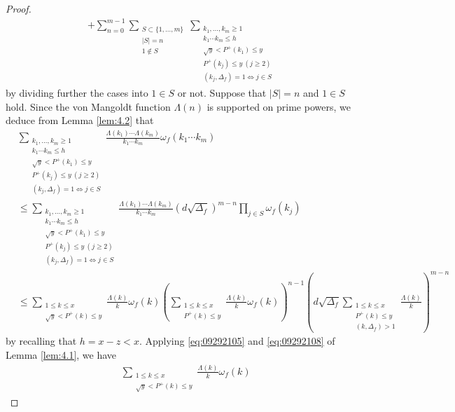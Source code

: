 \documentclass[a4paper,11pt]{amsart}
\theoremstyle{definition}
\numberwithin{equation}{section}
\begin{document}
\begin{proof}
\begin{align}
+ \sum_{n=0}^{m-1} \sum_{\substack{S \subset \{1, \ldots, m\} \\ |S|=n \\ 1 \notin S}}
\sum_{\substack{k_1,\ldots,k_m \geq 1 \\ k_1 \cdots k_m \leq h \\ \sqrt{y} < P^+(k_1) \leq y  \\ P^+(k_j) \leq y ~(j \geq 2) \\ (k_j,\Delta_f)=1 \Leftrightarrow j \in S}} \nonumber
\end{align}
by dividing further the cases into $1 \in S$ or not.
Suppose that $|S|=n$ and $1 \in S$ hold. 
Since the von Mangoldt function $\Lambda(n)$ is supported on prime powers, we deduce from Lemma \ref{lem:4.2} that
\begin{align*}
&\sum_{\substack{k_1,\ldots,k_m \geq 1 \\ k_1 \cdots k_m \leq h \\ \sqrt{y} < P^+(k_1) \leq y  \\ P^+(k_j) \leq y ~(j \geq 2) \\ (k_j,\Delta_f)=1 \Leftrightarrow j \in S}} 
\frac{\Lambda(k_1) \cdots \Lambda(k_m)}{k_1 \cdots k_m} \omega_f(k_1 \cdots k_m) \\
&\leq \sum_{\substack{k_1,\ldots,k_m \geq 1 \\ k_1 \cdots k_m \leq h \\ \sqrt{y} < P^+(k_1) \leq y  \\ P^+(k_j) \leq y ~(j \geq 2) \\ (k_j,\Delta_f)=1 \Leftrightarrow j \in S}} 
\frac{\Lambda(k_1) \cdots \Lambda(k_m)}{k_1 \cdots k_m} (d \sqrt{\Delta_f})^{m-n} \prod_{j \in S} \omega_f(k_j) \\
&\leq \sum_{\substack{1 \leq k \leq x \\ \sqrt{y}< P^+(k) \leq y}} \frac{\Lambda(k)}{k} \omega_f(k)
\left(\sum_{\substack{1 \leq k \leq x \\ P^+(k) \leq y}} \frac{\Lambda(k)}{k} \omega_f(k)\right)^{n-1} 
\left(d \sqrt{\Delta_f} \sum_{\substack{1 \leq k \leq x \\ P^+(k) \leq y \\ (k,\Delta_f)>1}} \frac{\Lambda(k)}{k} \right)^{m-n} 
\end{align*}
by recalling that $h=x-z<x$. 
Applying \eqref{eq:09292105} and \eqref{eq:09292108} of Lemma \ref{lem:4.1}, we have
\begin{align*}
&\sum_{\substack{1 \leq k \leq x \\ \sqrt{y}< P^+(k) \leq y}} \frac{\Lambda(k)}{k} \omega_f(k)

\end{align*}
\end{proof}
\end{document}
